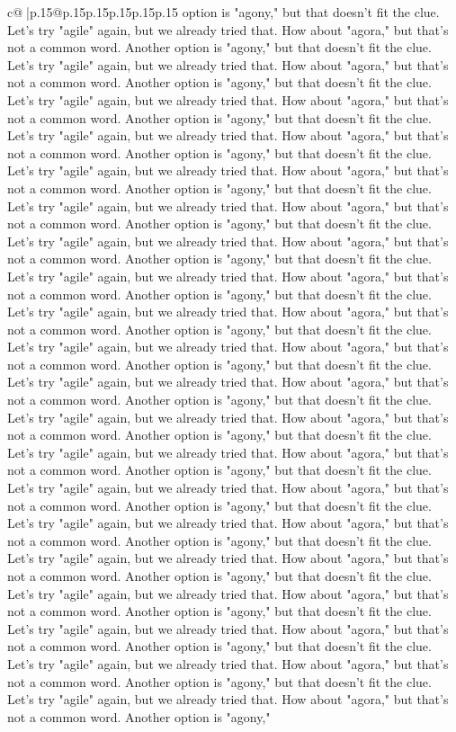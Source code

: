 \documentclass{article}
\begin{document}
{\begin{supertabular}{c@{$\;$}|p{.15\linewidth}@{}p{.15\linewidth}p{.15\linewidth}p{.15\linewidth}p{.15\linewidth}p{.15\linewidth}}
{{{option is "agony," but that doesn't fit the clue. Let's try "agile" again, but we already tried that. How about "agora," but that's not a common word. Another option is "agony," but that doesn't fit the clue. Let's try "agile" again, but we already tried that. How about "agora," but that's not a common word. Another option is "agony," but that doesn't fit the clue. Let's try "agile" again, but we already tried that. How about "agora," but that's not a common word. Another option is "agony," but that doesn't fit the clue. Let's try "agile" again, but we already tried that. How about "agora," but that's not a common word. Another option is "agony," but that doesn't fit the clue. Let's try "agile" again, but we already tried that. How about "agora," but that's not a common word. Another option is "agony," but that doesn't fit the clue. Let's try "agile" again, but we already tried that. How about "agora," but that's not a common word. Another option is "agony," but that doesn't fit the clue. Let's try "agile" again, but we already tried that. How about "agora," but that's not a common word. Another option is "agony," but that doesn't fit the clue. Let's try "agile" again, but we already tried that. How about "agora," but that's not a common word. Another option is "agony," but that doesn't fit the clue. Let's try "agile" again, but we already tried that. How about "agora," but that's not a common word. Another option is "agony," but that doesn't fit the clue. Let's try "agile" again, but we already tried that. How about "agora," but that's not a common word. Another option is "agony," but that doesn't fit the clue. Let's try "agile" again, but we already tried that. How about "agora," but that's not a common word. Another option is "agony," but that doesn't fit the clue. Let's try "agile" again, but we already tried that. How about "agora," but that's not a common word. Another option is "agony," but that doesn't fit the clue. Let's try "agile" again, but we already tried that. How about "agora," but that's not a common word. Another option is "agony," but that doesn't fit the clue. Let's try "agile" again, but we already tried that. How about "agora," but that's not a common word. Another option is "agony," but that doesn't fit the clue. Let's try "agile" again, but we already tried that. How about "agora," but that's not a common word. Another option is "agony," but that doesn't fit the clue. Let's try "agile" again, but we already tried that. How about "agora," but that's not a common word. Another option is "agony," but that doesn't fit the clue. Let's try "agile" again, but we already tried that. How about "agora," but that's not a common word. Another option is "agony," but that doesn't fit the clue. Let's try "agile" again, but we already tried that. How about "agora," but that's not a common word. Another option is "agony," but that doesn't fit the clue. Let's try "agile" again, but we already tried that. How about "agora," but that's not a common word. Another option is "agony," but that doesn't fit the clue. Let's try "agile" again, but we already tried that. How about "agora," but that's not a common word. Another option is "agony," }}}
\end{supertabular}}
\end{document}
